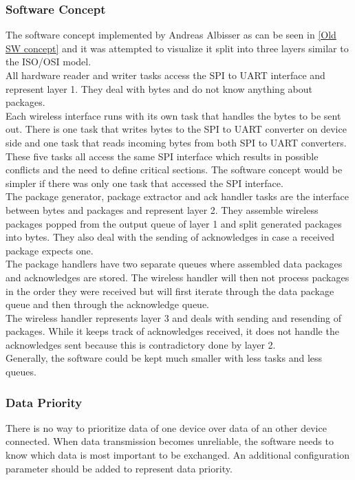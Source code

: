 \subsubsection{Software Concept}
The software concept implemented by Andreas Albisser as can be seen in \autoref{Old SW concept} and it was attempted to visualize it split into three layers similar to the ISO/OSI model.\\
All hardware reader and writer tasks access the SPI to UART interface and represent layer 1. They deal with bytes and do not know anything about packages.\\
Each wireless interface runs with its own task that handles the bytes to be sent out. There is one task that writes bytes to the SPI to UART converter on device side and one task that reads incoming bytes from both SPI to UART converters. These five tasks all access the same SPI interface which results in possible conflicts and the need to define critical sections. The software concept would be simpler if there was only one task that accessed the SPI interface.\\
The package generator, package extractor and ack handler tasks are the interface between bytes and packages and represent layer 2. They assemble wireless packages popped from the output queue of layer 1 and split generated packages into bytes. They also deal with the sending of acknowledges in case a received package expects one.\\
The package handlers have two separate queues where assembled data packages and acknowledges are stored. The wireless handler will then not process packages in the order they were received but will first iterate through the data package queue and then through the acknowledge queue.\\
The wireless handler represents layer 3 and deals with sending and resending of packages. While it keeps track of acknowledges received, it does not handle the acknowledges sent because this is contradictory done by layer 2.\\
Generally, the software could be kept much smaller with less tasks and less queues.\\
%
\subsubsection{Data Priority}
There is no way to prioritize data of one device over data of an other device connected. When data transmission becomes unreliable, the software needs to know which data is most important to be exchanged. An additional configuration parameter should be added to represent data priority.\\